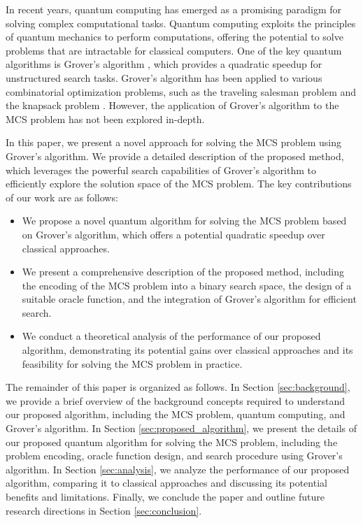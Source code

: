 In recent years, quantum computing has emerged as a promising paradigm for solving complex computational tasks. Quantum computing exploits the principles of quantum mechanics to perform computations, offering the potential to solve problems that are intractable for classical computers. One of the key quantum algorithms is Grover's algorithm \cite{grover1996fast}, which provides a quadratic speedup for unstructured search tasks. Grover's algorithm has been applied to various combinatorial optimization problems, such as the traveling salesman problem \cite{daskin2012quantum} and the knapsack problem \cite{han2017quantum}. However, the application of Grover's algorithm to the MCS problem has not been explored in-depth.

In this paper, we present a novel approach for solving the MCS problem using Grover's algorithm. We provide a detailed description of the proposed method, which leverages the powerful search capabilities of Grover's algorithm to efficiently explore the solution space of the MCS problem. The key contributions of our work are as follows:

\begin{itemize}
    \item We propose a novel quantum algorithm for solving the MCS problem based on Grover's algorithm, which offers a potential quadratic speedup over classical approaches.
    
    \item We present a comprehensive description of the proposed method, including the encoding of the MCS problem into a binary search space, the design of a suitable oracle function, and the integration of Grover's algorithm for efficient search.
    
    \item We conduct a theoretical analysis of the performance of our proposed algorithm, demonstrating its potential gains over classical approaches and its feasibility for solving the MCS problem in practice.
\end{itemize}

The remainder of this paper is organized as follows. In Section \ref{sec:background}, we provide a brief overview of the background concepts required to understand our proposed algorithm, including the MCS problem, quantum computing, and Grover's algorithm. In Section \ref{sec:proposed_algorithm}, we present the details of our proposed quantum algorithm for solving the MCS problem, including the problem encoding, oracle function design, and search procedure using Grover's algorithm. In Section \ref{sec:analysis}, we analyze the performance of our proposed algorithm, comparing it to classical approaches and discussing its potential benefits and limitations. Finally, we conclude the paper and outline future research directions in Section \ref{sec:conclusion}.

